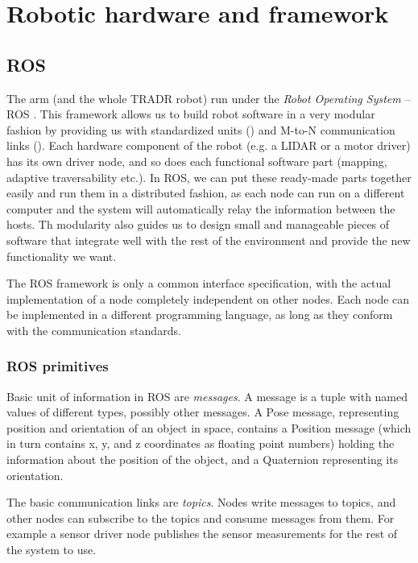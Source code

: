 \documentclass[buriama8_dp.tex]{subfiles}
\begin{document}
\chapter{Robotic hardware and framework}

\section{ROS}
\label{sec:ros}

The arm (and the whole TRADR robot) run under the \emph{Robot Operating System} – ROS \cite{ros_paper}. This framework allows us to build robot software in a very modular fashion by providing us with standardized units () and M-to-N communication links (). Each hardware component of the robot (e.g. a LIDAR or a motor driver) has its own driver node, and so does each functional software part (mapping, adaptive traversability etc.). In ROS, we can put these ready-made parts together easily and run them in a distributed fashion, as each node can run on a different computer and the system will automatically relay the information between the hosts. Th modularity also guides us to design small and manageable pieces of software that integrate well with the rest of the environment and provide the new functionality we want.

The ROS framework is only a common interface specification, with the actual implementation of a node completely independent on other nodes. Each node can be implemented in a different programming language, as long as they conform with the communication standards.

\subsection{ROS primitives}
\label{subsec:ros_prims}

Basic unit of information in ROS are \emph{messages}. A message is a tuple with named values of different types, possibly other messages. A Pose message, representing position and orientation of an object in space, contains a Position message (which in turn contains \m x, \m y, and \m z coordinates as floating point numbers) holding the information about the position of the object, and a Quaternion representing its orientation.

The basic communication links are \emph{topics}. Nodes write messages to topics, and other nodes can subscribe to the topics and consume messages from them. For example a sensor driver node publishes the sensor measurements for the rest of the system to use.
\end{document}
